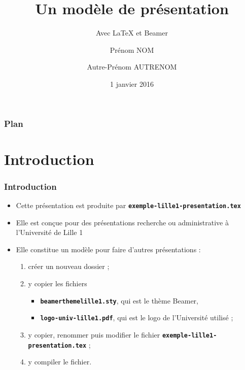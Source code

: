 \documentclass[10pt,t]{beamer}
\title{Un modèle de présentation}
\subtitle{Avec \LaTeX{} et Beamer}
\author{Prénom NOM \and Autre-Prénom AUTRENOM}
\institute{Université de Lille 1}
\date{1\ier{} janvier 2016}
\begin{document}
\maketitle

\begin{frame}
  \frametitle{Plan}
  \tableofcontents %
\end{frame}


\section{Introduction}


\begin{frame}%
  \frametitle{Introduction}


  \begin{itemize}
  \item Cette présentation est produite par \texttt{\textbf{exemple-lille1-presentation.tex}}
  \item Elle est conçue pour des présentations recherche ou administrative à l'Université de Lille 1
  \end{itemize}

  \pause


  \begin{itemize}
  \item Elle constitue un modèle pour faire d'autres présentations :
    
    \begin{enumerate}
    \item créer un nouveau dossier ;
    \item y copier les fichiers 

      \begin{itemize}
      \item \texttt{\textbf{beamerthemelille1.sty}}, qui est le thème Beamer,
      \item \texttt{\textbf{logo-univ-lille1.pdf}}, qui est le logo de l'Université utilisé ;
      \end{itemize}

    \item y copier, renommer puis modifier le fichier \texttt{\textbf{exemple-lille1-presentation.tex}} ;
    \item y compiler le fichier.
    \end{enumerate}
  \end{itemize}
  
\end{frame}
\end{document}
